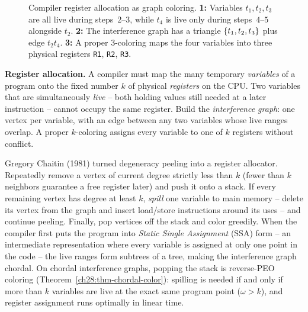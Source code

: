 \begin{figure}[htbp]
\caption{Compiler register allocation as graph coloring. \textbf{1:} Variables $t_1,t_2,t_3$ are all live during steps~$2$--$3$, while $t_4$ is live only during steps~$4$--$5$ alongside $t_2$. \textbf{2:} The interference graph has a triangle $\{t_1,t_2,t_3\}$ plus edge $t_2t_4$. \textbf{3:} A proper $3$-coloring maps the four variables into three physical registers \texttt{R1}, \texttt{R2}, \texttt{R3}.}
\label{ch28:fig-register-alloc}
\end{figure}

\begin{applicationbox}
\textbf{Register allocation.} A compiler must map the many temporary
\emph{variables} of a program onto the fixed number $k$ of physical \emph{registers} on the CPU.
Two variables that are simultaneously \emph{live} -- both holding values still needed at a later instruction -- cannot occupy the same register. Build the \emph{interference graph}: one vertex
per variable, with an edge between any two variables whose live ranges overlap. A proper
$k$-coloring assigns every variable to one of $k$ registers without conflict.

Gregory Chaitin (1981) turned degeneracy peeling into a register allocator. Repeatedly remove a
vertex of current degree strictly less than $k$ (fewer than $k$ neighbors guarantee a free register later) and push it onto a stack. If every remaining vertex has degree at least $k$, \emph{spill} one variable to main memory -- delete its vertex from the graph and insert load/store instructions around its uses -- and continue peeling. Finally, pop vertices off the stack and color greedily. When the compiler first puts the program into \emph{Static Single Assignment} (SSA) form -- an intermediate representation where every variable is assigned at only one point in the code -- the live ranges form subtrees of a tree, making the interference graph chordal. On chordal interference graphs, popping the stack is reverse-PEO coloring (Theorem~\ref{ch28:thm-chordal-color}): spilling is needed if and only if more than $k$ variables are live at the exact same program point ($\omega>k$), and register assignment runs optimally in linear time.
\end{applicationbox}

